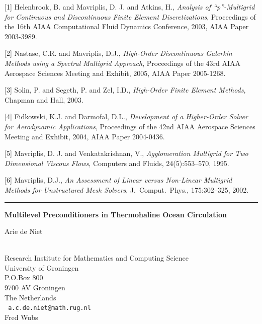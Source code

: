 \documentclass[twosided]{report}
\begin{document}
[1] Helenbrook, B. and Mavriplis, D. J. and Atkins, H.,
{\em Analysis of
``p''-Multigrid for Continuous and Discontinuous Finite Element
Discretizations}, Proceedings of the 16th AIAA Computational Fluid
Dynamics Conference, 2003, AIAA Paper 2003-3989.

[2] Nastase, C.R. and Mavriplis, D.J.,
{\em High-Order Discontinuous
Galerkin Methods using a Spectral Multigrid Approach}, Proceedings of
the 43rd AIAA Aerospace Sciences Meeting and Exhibit, 2005, AIAA Paper
2005-1268.

[3] Solin, P. and Segeth, P. and Zel, I.D.,
{\em High-Order Finite Element Methods}, Chapman and Hall, 2003.

[4] Fidkowski, K.J. and Darmofal, D.L.,
{\em Development of a
Higher-Order Solver for Aerodynamic Applications}, Proceedings of the
42nd AIAA Aerospace Sciences Meeting and Exhibit, 2004, AIAA Paper
2004-0436.

[5] Mavriplis, D. J. and Venkatakrishnan, V.,
{\em Agglomeration Multigrid for Two Dimensional Viscous Flows},
Computers and Fluids, 24(5):553--570, 1995.

[6] Mavriplis, D.J.,
{\em An Assessment of Linear versus Non-Linear
Multigrid Methods for Unstructured Mesh Solvers},
J.~Comput.~Phys., 175:302--325, 2002.

\begin{center}

\rule{6in}{1pt}
\end{center}

\begin{center}
{\large			\label{niet}
{\bf
Multilevel Preconditioners in Thermohaline Ocean Circulation
}

Arie de Niet} \\
Research Institute for Mathematics and Computing Science
\\
University of Groningen
\\
P.O.Box 800 \\
9700 AV Groningen \\
The Netherlands
\\ {\tt
a.c.de.niet@math.rug.nl
}
\\
Fred Wubs
\end{center}
\end{document}
